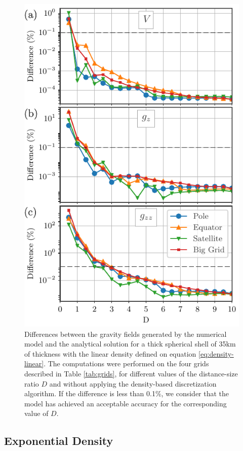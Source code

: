 \documentclass[extra]{gji}
\begin{document}
\begin{figure}
\centering
\includegraphics[width=0.9\linewidth]{figures/linear-D-thick.pdf}
\caption{
    Differences between the gravity fields generated by the numerical model and the analytical solution for a thick spherical shell of 35km of thickness with the linear density defined on equation \ref{eq:density-linear}. The computations were performed on the four grids described in Table \ref{tab:grids}, for different values of the distance-size ratio $D$ and without applying the density-based discretization algorithm. If the difference is less than 0.1\%, we consider that the model has achieved an acceptable accuracy for the corresponding value of $D$.
}
\label{fig:D-linear-thick}
\end{figure}


\subsection{Exponential Density}
\end{document}
